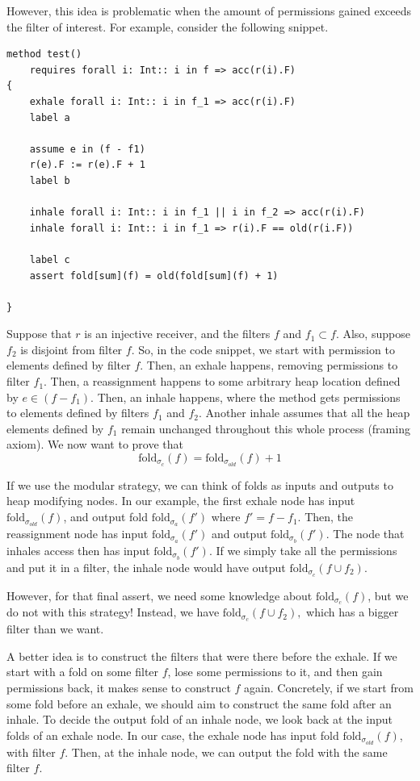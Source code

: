 \documentclass[msc,oneside]{ubcthesis}
\begin{document}
However, this idea is problematic when the amount of permissions gained exceeds the filter of interest. For example, consider the following snippet.
\begin{lstlisting}
method test()
    requires forall i: Int:: i in f => acc(r(i).F)
{
    exhale forall i: Int:: i in f_1 => acc(r(i).F)
    label a
    
    assume e in (f - f1)
    r(e).F := r(e).F + 1
    label b
    
    inhale forall i: Int:: i in f_1 || i in f_2 => acc(r(i).F) 
    inhale forall i: Int:: i in f_1 => r(i).F == old(r(i.F))
            
    label c
    assert fold[sum](f) = old(fold[sum](f) + 1)

}
\end{lstlisting}
Suppose that $r$ is an injective receiver, and the filters $f$ and $f_1 \subset f$. Also, suppose $f_2$ is disjoint from filter $f$. So, in the code snippet, we start with permission to elements defined by filter $f$. Then, an exhale happens, removing permissions to filter $f_1$. Then, a reassignment happens to some arbitrary heap location defined by $e \in (f - f_1)$. Then, an inhale happens, where the method gets permissions to elements defined by filters $f_1$ and $f_2$. Another inhale assumes that all the heap elements defined by $f_1$ remain unchanged throughout this whole process (framing axiom). We now want to prove that 
$$\textrm{fold}_{\sigma_{c}}(f) = \textrm{fold}_{\sigma_{old}}(f) + 1$$

If we use the modular strategy, we can think of folds as inputs and outputs to heap modifying nodes. In our example, the first exhale node has input $\textrm{fold}_{\sigma_{old}}(f)$, and output fold $\textrm{fold}_{\sigma_{a}}(f')$ where $f' = f - f_1$. Then, the reassignment node has input 
$\textrm{fold}_{\sigma_{a}}(f')$ and output $\textrm{fold}_{\sigma_{b}}(f')$.
The node that inhales access then has input $\textrm{fold}_{\sigma_{b}}(f')$. If we simply take all the permissions and put it in a filter, the inhale node would have output $\textrm{fold}_{\sigma_{c}}(f \cup f_2 ).$

However, for that final assert, we need some knowledge about $\textrm{fold}_{\sigma_{c}}(f)$, but we do not with this strategy! Instead, we have $\textrm{fold}_{\sigma_{c}}(f \cup f_2 ),$ which has a bigger filter than we want.

A better idea is to construct the filters that were there before the exhale. If we start with a fold on some filter $f$, lose some permissions to it, and then gain permissions back, it makes sense to construct $f$ again. Concretely, if we start from some fold before an exhale, we should aim to construct the same fold after an inhale. To decide the output fold of an inhale node, we look back at the input folds of an exhale node. In our case, the exhale node has input fold $\textrm{fold}_{\sigma_{old}}(f)$, with filter $f$. Then, at the inhale node, we can output the fold with the same filter $f$.
\end{document}
